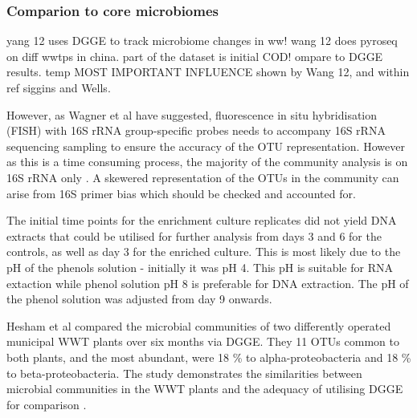 \documentclass[11pt]{article}
\begin{document}
\subsubsection{Comparion to core microbiomes}

yang 12 uses DGGE to track microbiome changes in ww!
wang 12 does pyroseq on diff wwtps in china. part of the dataset is initial COD! ompare to DGGE results. temp MOST IMPORTANT INFLUENCE shown by Wang 12, and within ref siggins and Wells.

However, as Wagner et al have suggested, fluorescence in situ hybridisation (FISH) with 16S rRNA  group-specific probes needs to accompany 16S rRNA sequencing sampling to ensure the accuracy of the OTU representation. However as this is a time consuming process, the majority of the community analysis is on 16S rRNA only \cite{Wagner_02} . A skewered representation of the OTUs in the community can arise from 16S primer bias which should be checked and accounted for.

The initial time points for the enrichment culture replicates did not yield DNA extracts that could be utilised for further analysis from days 3 and 6 for the controls, as well as day 3 for the enriched culture. This is most likely due to the pH of the phenols solution - initially it was pH 4. This pH is suitable for RNA extaction while phenol solution pH 8 is preferable for DNA extraction. The pH of the phenol solution was adjusted from day 9 onwards.

Hesham et al compared the microbial communities of two differently operated municipal WWT plants over six months via DGGE. They 11 OTUs common to both plants, and the most abundant, were 18 \% to alpha-proteobacteria and 18 \% to beta-proteobacteria. The study demonstrates the similarities between microbial communities in the WWT plants and the adequacy of utilising DGGE for comparison \cite{Hesham_11}.
\end{document}
